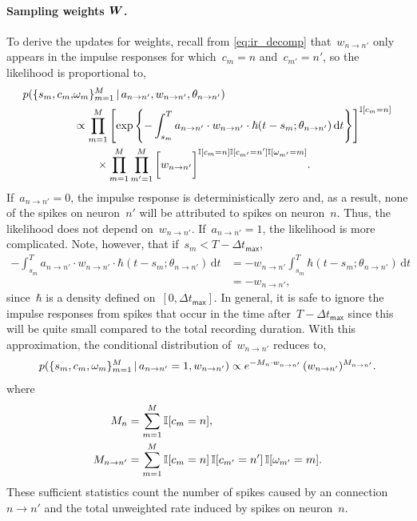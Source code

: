 \paragraph{Sampling weights $\boldsymbol{W}$.} 
To derive the updates for weights, recall from
\eqref{eq:ir_decomp} that~${w_{n \to n'}}$ only
appears in the impulse responses for which~${c_m=n}$
and~${c_{m'}=n'}$, so the likelihood is proportional to,
\begin{align*}
  p(\{s_m, c_m, & \omega_m\}^M_{m=1} \,|\, a_{n \to n'}, w_{n \to n'}, 
  \theta_{n \to n'}) \\
  &\propto \prod_{m=1}^M\left[
    \exp\left\{-\int^T_{s_m} a_{n \to n'} \cdot w_{n \to n'} \cdot \hbar(t - s_m; \theta_{n \to n'}) \, \mathrm{d}t
    \right\} \right]^{\mathbb{I}[c_m=n]} \\
  &\qquad \times \prod_{m=1}^M \prod_{m'=1}^M \bigg[
    w_{n \to n'}\bigg]^{\mathbb{I}[c_{m}=n] \mathbb{I}[c_{m'}=n'] \mathbb{I}[\omega_{m'}=m]}.
\end{align*}
If~${a_{n \to n'}=0}$, the impulse response is deterministically zero
and, as a result, none of the spikes on neuron~$n'$ will be attributed to spikes
on neuron~$n$. Thus, the likelihood does not depend on~$w_{n \to n'}$.
If~${a_{n \to n'}=1}$, the likelihood is more complicated.
Note, however, that if~${s_m < T - \Delta t_{\mathsf{max}}}$,
\begin{align*}
  -\int^T_{s_m} a_{n \to n'} \cdot w_{n \to n'} \cdot
  \hbar(t - s_m; \theta_{n \to n'}) \, \mathrm{d}t
  &= -w_{n \to n'}  \int^T_{s_m} \hbar(t - s_m; \theta_{n \to n'}) \, \mathrm{d}t \\
  &= - w_{n \to n'},
\end{align*}
since~$\hbar$ is a density defined on~$[0,\Delta t_{\mathsf{max}}]$.
In general, it is safe to ignore the impulse responses from spikes that 
occur in the time after~$T-\Delta t_{\mathsf{max}}$ since this will be 
quite small compared to the total recording duration. 
With this approximation, the conditional distribution of~$w_{n \to n'}$
reduces to,
\begin{align*}
  p(\{s_m,c_m, \omega_m\}^M_{m=1} \,|\, a_{n \to n'}=1, w_{n \to n'}) 
  \propto 
  e^{-M_n \cdot w_{n \to n'}}  \,
  (w_{n \to n'})^{M_{n \to n'}}.
\end{align*}
where
\begin{align*}
  M_{n} &= \sum_{m=1}^M \mathbb{I}[c_{m}=n], \\
  M_{n \to n'} &= \sum_{m=1}^M \mathbb{I}[c_{m}=n] \, \mathbb{I}[c_{m'}=n'] \, \mathbb{I}[\omega_{m'}=m].
\end{align*}
These sufficient statistics count the number of spikes caused
by an connection~${n \to n'}$ and the total unweighted rate induced by
spikes on neuron~$n$.

